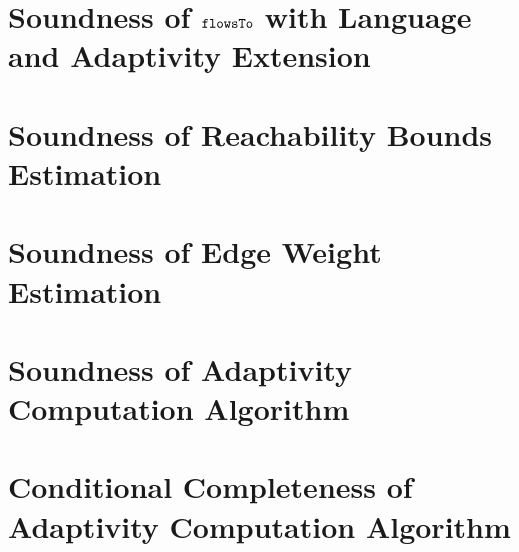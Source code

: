 \documentclass[a4paper,11pt]{article}
\newcommand{\highlight}[1]{\textcolor[rgb]{.0,0.0,1.0}{ #1}}
\begin{document}
\section{Soundness of $\mathtt{flowsTo}$ \highlight{with Language and Adaptivity Extension}}
\label{apdx:flowsto_soundness_extend}

\clearpage
% 
% 
% 
% 
\section{Soundness of Reachability Bounds Estimation}
\label{apdx:reachability_soundness}

\clearpage
\section{Soundness of Edge Weight Estimation}
\label{apdx:edgeweight_soundness}

\clearpage
% 
\section{Soundness of Adaptivity Computation Algorithm}
\label{apdx:adaptalg_soundness}

\section{Conditional Completeness of Adaptivity Computation Algorithm}
\label{apdx:adaptalg_completeness}



\end{document}
